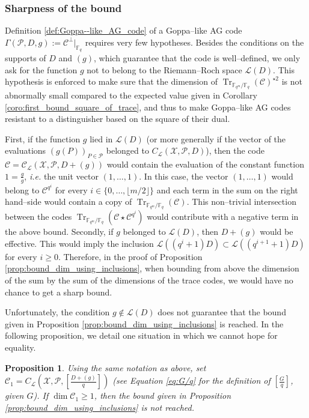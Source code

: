 \documentclass[a4paper]{amsart}
\newtheorem{proposition}[thm]{Proposition}
\theoremstyle{definition}
\theoremstyle{remark}
\newcommand{\calP}{\mathcal{P}}
\newcommand{\calL}{\mathcal{L}}
\newcommand{\calC}{\mathcal{C}}
\newcommand{\calX}{\mathcal{X}}
\newcommand{\fq}{\mathbb{F}_{q}}
\newcommand{\Tr}[1]{\operatorname{Tr}_{\mathbb{F}_{q^m}/\fq}\left(#1\right)}
\begin{document}
\subsubsection{Sharpness of the bound} \label{section:sharpness}

Definition \ref{def:Goppa--like_AG_code} of a Goppa--like AG code $\Gamma(\calP,D,g) := \calC^{\perp}|_{\fq}$ requires very few hypotheses. Besides the conditions on the supports of $D$ and $(g)$, which guarantee that the code is well--defined, we only ask for the function $g$ not to belong to the Riemann--Roch space $\calL(D)$. This hypothesis is enforced to make sure that the dimension of $\Tr{\calC}^{\star 2}$ is not abnormally small compared to the expected value given in Corollary \ref{coro:first_bound_square_of_trace}, and thus to make Goppa--like AG codes resistant to a distinguisher based on the square of their dual.

First, if the function $g$ lied in $\calL(D)$ (or more generally if the vector of the evaluations $(g(P))_{P \in \calP}$ belonged to $C_\calL(\calX,\calP,D)$), then the code $\calC= \calC_{\calL}(\calX,\calP,D+(g))$ would contain the evaluation of the constant function $1=\frac{g}{g}$, \textit{i.e.} the unit vector $(1,\dots,1)$. In this case, the vector $(1,\dots,1)$ would belong to $\calC^{q^i}$ for every $i \in \{0,\dots, \lfloor{m/2} \rfloor\}$ and each term in the sum on the right hand--side would contain a copy of $\Tr{\calC}$. This non--trivial intersection between the codes $\Tr{\calC\star \calC^{q^i}}$ would contribute with a negative term in the above bound.
Secondly, if $g$ belonged to $\calL(D)$, then $D+(g)$ would be effective. This would imply the inclusion $\calL((q^i+1)D) \subset \calL((q^{i+1}+1)D)$ for every $i \geq 0$. Therefore, in the proof of Proposition \ref{prop:bound_dim_using_inclusions}, when bounding from above the dimension of the sum by the sum of the dimensions of the trace codes, we would have no chance to get a sharp bound.

Unfortunately, the condition $g \notin \calL(D)$ does not guarantee that the bound given in Proposition \ref{prop:bound_dim_using_inclusions} is reached. In the following proposition, we detail one situation in which we cannot hope for equality.

\begin{proposition}\label{prop:non-eq}
	Using the same notation as above, set $\calC_1=C_{\calL}\left(\calX,\mathcal{P},\left[ \frac{D+(g)}{q} \right]\right)$ (see Equation \eqref{eq:G/q} for the definition of $\left[ \frac{G}{q} \right]$, given $G$). If $\dim \calC_1 \geq 1$, then the bound given in Proposition \ref{prop:bound_dim_using_inclusions} is not reached.
\end{proposition}
\end{document}
